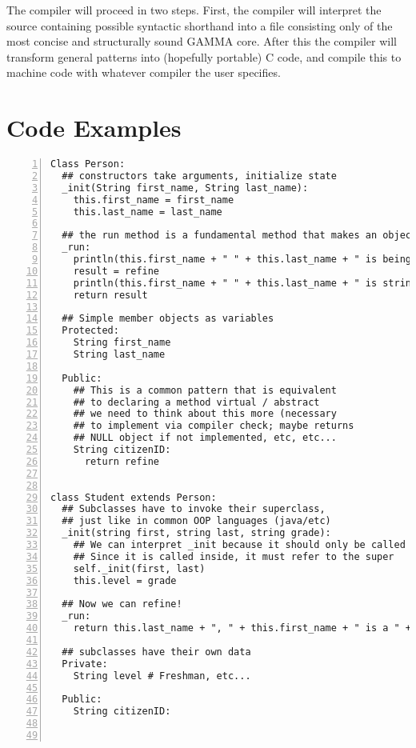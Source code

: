 \documentclass[10pt]{article}
\begin{document}
The compiler will proceed in two steps. First, the compiler will interpret
the source containing possible syntactic shorthand into a file
consisting only of the most concise and structurally sound GAMMA core. After this the compiler will transform
general patterns into (hopefully portable) C code, and compile this to
machine code with whatever compiler the user specifies.

\section*{Code Examples}

\begin{lstlisting}[numbers=left,label=The All-mighty Pattern,caption=The All-mighty Pattern]
Class Person:
  ## constructors take arguments, initialize state
  _init(String first_name, String last_name):
    this.first_name = first_name
    this.last_name = last_name

  ## the run method is a fundamental method that makes an object callable
  _run:
    println(this.first_name + " " + this.last_name + " is being stringified!")
    result = refine
    println(this.first_name + " " + this.last_name + " is strinfigied into " + result + "!")
    return result

  ## Simple member objects as variables
  Protected:
    String first_name
    String last_name

  Public:
    ## This is a common pattern that is equivalent
    ## to declaring a method virtual / abstract
    ## we need to think about this more (necessary
    ## to implement via compiler check; maybe returns
    ## NULL object if not implemented, etc, etc...
    String citizenID:
      return refine


class Student extends Person:
  ## Subclasses have to invoke their superclass,
  ## just like in common OOP languages (java/etc)
  _init(string first, string last, string grade):
    ## We can interpret _init because it should only be called through the Person() construction.
    ## Since it is called inside, it must refer to the super
    self._init(first, last)
    this.level = grade

  ## Now we can refine!
  _run:
    return this.last_name + ", " + this.first_name + " is a " + this.level
    
  ## subclasses have their own data
  Private:
    String level # Freshman, etc...

  Public:
    String citizenID:
      
  
\end{lstlisting}
\end{document}
